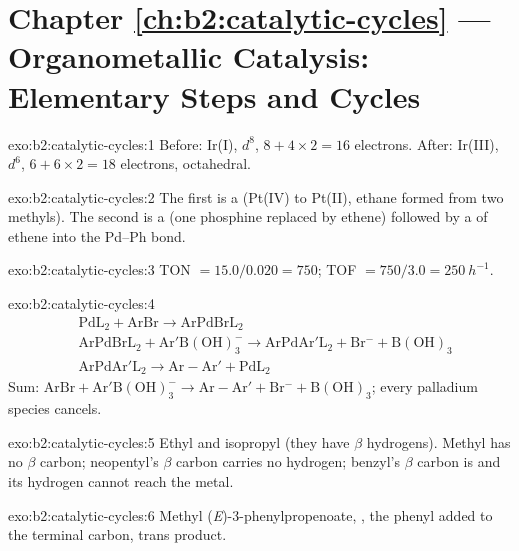 \section*{Chapter \ref{ch:b2:catalytic-cycles} --- Organometallic Catalysis: Elementary Steps and Cycles}

\begin{solution}{exo:b2:catalytic-cycles:1}
Before: Ir(I), $d^8$, $8 + 4 \times 2 = 16$ electrons. After: Ir(III), $d^6$, $6 + 6 \times 2 = 18$
electrons, octahedral.
\end{solution}

\begin{solution}{exo:b2:catalytic-cycles:2}
The first is a  (Pt(IV) to Pt(II), ethane formed from two methyls).
The second is a  (one phosphine replaced by ethene) followed by a
 of ethene into the Pd--Ph bond.
\end{solution}

\begin{solution}{exo:b2:catalytic-cycles:3}
TON $= 15.0/0.020 = 750$; TOF $= 750/3.0 = \qty{250}{h^{-1}}$.
\end{solution}

\begin{solution}{exo:b2:catalytic-cycles:4}
\begin{align*}
  &\mathrm{PdL_2 + ArBr \to ArPdBrL_2}\\
  &\mathrm{ArPdBrL_2 + Ar'B(OH)_3^- \to ArPdAr'L_2 + Br^- + B(OH)_3}\\
  &\mathrm{ArPdAr'L_2 \to Ar{-}Ar' + PdL_2}
\end{align*}
Sum: $\mathrm{ArBr + Ar'B(OH)_3^- \to Ar{-}Ar' + Br^- + B(OH)_3}$; every palladium species
cancels.
\end{solution}

\begin{solution}{exo:b2:catalytic-cycles:5}
Ethyl and isopropyl (they have $\beta$ hydrogens). Methyl has no $\beta$ carbon; neopentyl's $\beta$
carbon carries no hydrogen; benzyl's $\beta$ carbon is  and its hydrogen cannot reach
the metal.
\end{solution}

\begin{solution}{exo:b2:catalytic-cycles:6}
Methyl (\textit{E})-3-phenylpropenoate, , the phenyl added to the
terminal carbon, trans product.
\end{solution}

